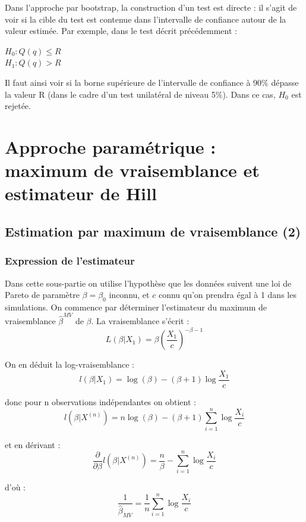 \documentclass{article}
\renewcommand*{\(}{ \left( }
\renewcommand*{\)}{ \right) }
\begin{document}
 
Dans l'approche par bootstrap, la construction d'un test est directe : il s'agit de voir si la cible du test est contenue dans l'intervalle de confiance autour de la valeur estimée. Par exemple, dans le test décrit précédemment :
\begin{center}
$H_0 : Q(q) \leq R$\\
$H_1 : Q(q) > R$\\
\end{center}
Il faut ainsi voir si la borne supérieure de l'intervalle de confiance à 90\% dépasse la valeur R (dans le cadre d'un test unilatéral de niveau 5\%). Dans ce cas, $H_0$ est rejetée.

\clearpage
\section{Approche paramétrique : maximum de vraisemblance et estimateur de Hill}

\subsection{Estimation par maximum de vraisemblance (2)}

\subsubsection{Expression de l'estimateur}

Dans cette sous-partie on utilise l'hypothèse que les données suivent une loi de Pareto de paramètre $\beta = \beta_0$ inconnu, et $c$ connu qu'on prendra égal à 1 dans les simulations. On commence par déterminer l'estimateur du maximum de vraisemblance  $\widehat{\beta}^{MV}$ de $\beta$. La vraisemblance s'écrit :
\[ L(\beta|X_1) = \beta \left( \frac{X_1}{c} \right)^{-\beta - 1} \]

\noindent On en déduit la log-vraisemblance :
\[ l(\beta|X_1) = \log(\beta) - (\beta + 1) \log \frac{X_1}{c} \]

\noindent donc pour n observations indépendantes on obtient :
\[ l\(\beta|X^{(n)}\) = n \log(\beta) - (\beta + 1) \sum_{i=1}^{n}\log \frac{X_i}{c} \]

\noindent et en dérivant :
\[ \frac{\partial}{\partial \beta} l\(\beta|X^{(n)}\) = \frac{n}{\beta} - \sum_{i=1}^{n}\log \frac{X_i}{c} \]

\noindent d'où :
\[\frac{1}{\widehat{\beta}_{MV}} = \frac{1}{n} \sum_{i=1}^{n}\log \frac{X_i}{c} \]
\end{document}
